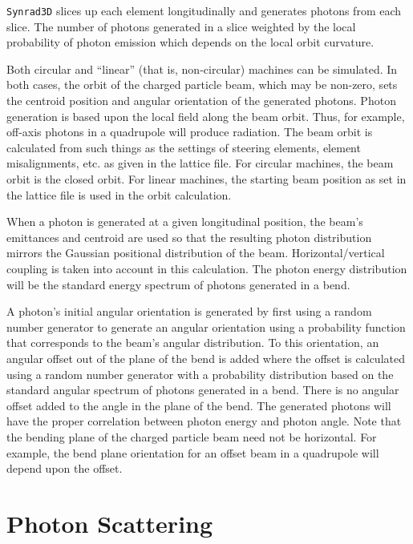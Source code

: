 \documentclass[11pt,openany]{report}
\newcommand{\srthree}{\texttt{Synrad3D}\xspace}
\begin{document}
\srthree slices up each element longitudinally
and generates photons from each slice. The number of photons generated
in a slice weighted by the local probability of photon emission which
depends on the local orbit curvature.

Both circular and ``linear'' (that is, non-circular) machines can be
simulated.  In both cases, the orbit of the charged particle beam,
which may be non-zero, sets the centroid position and angular
orientation of the generated photons. Photon generation is based upon
the local field along the beam orbit. Thus, for example, off-axis
photons in a quadrupole will produce radiation. The beam orbit is
calculated from such things as the settings of steering elements,
element misalignments, etc. as given in the lattice file. For circular
machines, the beam orbit is the closed orbit. For linear machines, the
starting beam position as set in the lattice file is used in the orbit
calculation.

When a photon is generated at a given longitudinal position, the
beam's emittances and centroid are used so that the resulting photon
distribution mirrors the Gaussian positional distribution of the beam.
Horizontal/vertical coupling is taken into account in this
calculation. The photon energy distribution will be the standard
energy spectrum of photons generated in a bend.

A photon's initial angular orientation is generated by first using a
random number generator to generate an angular orientation using a
probability function that corresponds to the beam's angular
distribution. To this orientation, an angular offset out of the plane
of the bend is added where the offset is calculated using a random
number generator with a probability distribution based on the standard
angular spectrum of photons generated in a bend. There is no angular
offset added to the angle in the plane of the bend. The generated
photons will have the proper correlation between photon energy and
photon angle. Note that the bending plane of the charged particle beam
need not be horizontal. For example, the bend plane orientation for an
offset beam in a quadrupole will depend upon the offset.

\section{Photon Scattering} 
\end{document}
